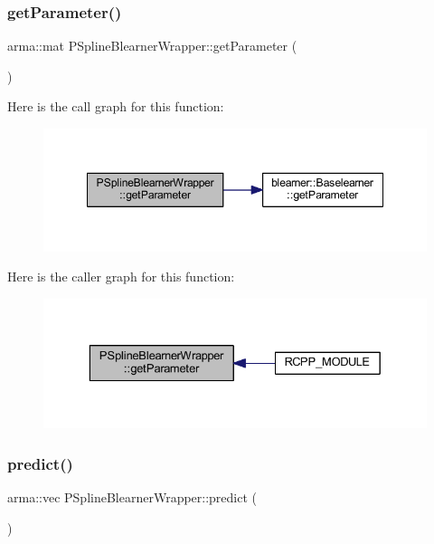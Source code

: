 \subsubsection{\texorpdfstring{get\+Parameter()}{getParameter()}}
{\footnotesize\ttfamily arma\+::mat P\+Spline\+Blearner\+Wrapper\+::get\+Parameter (\begin{DoxyParamCaption}{ }\end{DoxyParamCaption})\hspace{0.3cm}{\ttfamily [inline]}}

Here is the call graph for this function\+:
\nopagebreak
\begin{figure}[H]
\begin{center}
\leavevmode
\includegraphics[width=348pt]{class_p_spline_blearner_wrapper_a2d9c9e319c4638c85a4d419918929f9b_cgraph}
\end{center}
\end{figure}
Here is the caller graph for this function\+:
\nopagebreak
\begin{figure}[H]
\begin{center}
\leavevmode
\includegraphics[width=329pt]{class_p_spline_blearner_wrapper_a2d9c9e319c4638c85a4d419918929f9b_icgraph}
\end{center}
\end{figure}
\mbox{\label{class_p_spline_blearner_wrapper_a43a442f80348b28fc40d8e4773678511}} 
\subsubsection{\texorpdfstring{predict()}{predict()}}
{\footnotesize\ttfamily arma\+::vec P\+Spline\+Blearner\+Wrapper\+::predict (\begin{DoxyParamCaption}{ }\end{DoxyParamCaption})\hspace{0.3cm}{\ttfamily [inline]}}

